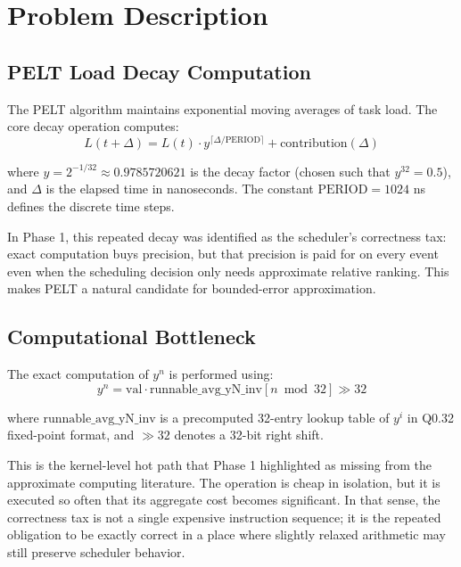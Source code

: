 \documentclass[conference]{IEEEtran}
\begin{document}
\section{Problem Description}\label{sec:problem}

\subsection{PELT Load Decay Computation}

The PELT algorithm maintains exponential moving averages of task load. The core decay operation computes:
\begin{equation}
L(t+\Delta) = L(t) \cdot y^{\lceil \Delta / \text{PERIOD} \rceil} + \text{contribution}(\Delta)
\label{eq:pelt}
\end{equation}

where $y = 2^{-1/32} \approx 0.9785720621$ is the decay factor (chosen such that $y^{32} = 0.5$), and $\Delta$ is the elapsed time in nanoseconds. The constant $\text{PERIOD} = 1024$ ns defines the discrete time steps.

In Phase 1, this repeated decay was identified as the scheduler's correctness tax: exact computation buys precision, but that precision is paid for on every event even when the scheduling decision only needs approximate relative ranking. This makes PELT a natural candidate for bounded-error approximation.

\subsection{Computational Bottleneck}

The exact computation of $y^n$ is performed using:
\begin{equation}
y^n = \text{val} \cdot \text{runnable\_avg\_yN\_inv}[n \bmod 32] \gg 32
\label{eq:exact_decay}
\end{equation}

where $\text{runnable\_avg\_yN\_inv}$ is a precomputed 32-entry lookup table of $y^i$ in Q0.32 fixed-point format, and $\gg 32$ denotes a 32-bit right shift.

This is the kernel-level hot path that Phase 1 highlighted as missing from the approximate computing literature. The operation is cheap in isolation, but it is executed so often that its aggregate cost becomes significant. In that sense, the correctness tax is not a single expensive instruction sequence; it is the repeated obligation to be exactly correct in a place where slightly relaxed arithmetic may still preserve scheduler behavior.
\end{document}
